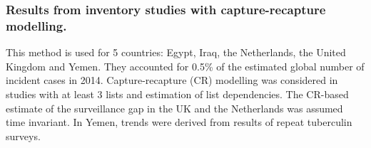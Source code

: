 \subsubsection {Results from inventory studies with capture-recapture modelling\cite{WHO2012}.} This method is used for 5 countries: Egypt\cite{20487611}, Iraq\cite{23485379}, the Netherlands\cite{17156496}, the United Kingdom\cite{Anderson2010} and Yemen\cite{23485378}. They accounted for 0.5\% of the estimated global number of incident cases in 2014. Capture-recapture (CR) modelling was considered in studies with at least 3 lists and estimation of list dependencies\cite{WHO2012}. The CR-based estimate of the surveillance gap in the UK and the Netherlands was assumed time invariant. In Yemen, trends were derived from results of repeat tuberculin surveys\cite{19723398}. 

